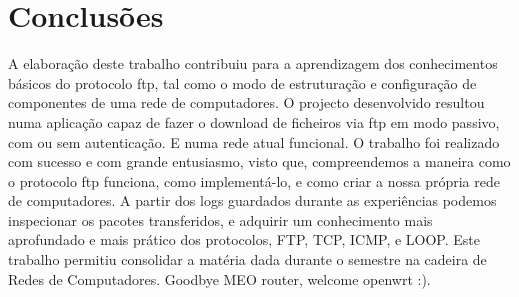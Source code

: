 \documentclass[a4paper]{article}
\begin{document}
\section{Conclusões}
A elaboração deste trabalho contribuiu para a aprendizagem dos conhecimentos
básicos do protocolo ftp, tal como o modo de estruturação e configuração de
componentes de uma rede de computadores. O projecto  desenvolvido resultou numa
aplicação capaz de fazer o download de ficheiros via ftp em modo passivo, com
ou sem autenticação. E numa rede atual funcional. O trabalho foi realizado com
sucesso e com grande entusiasmo, visto que, compreendemos a maneira como o
protocolo ftp funciona, como implementá-lo, e como criar a nossa própria rede
de computadores. A partir dos logs guardados durante as experiências podemos
inspecionar os pacotes transferidos, e adquirir um conhecimento mais
aprofundado e mais prático dos protocolos, FTP, TCP, ICMP, e LOOP. Este
trabalho permitiu consolidar a matéria dada durante o semestre na cadeira de
Redes de Computadores. Goodbye MEO router, welcome openwrt :).
\end{document}
